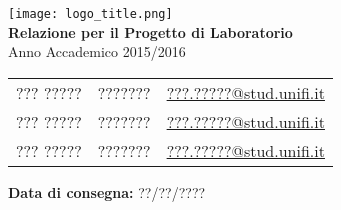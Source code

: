 \begin{center}
   	\texttt{[image: logo\_title.png]}\\[0.8cm]
    {\huge\bfseries Relazione per il Progetto di Laboratorio}\\
    Anno Accademico 2015/2016\\[0.8cm]
	
    \begin{tabular*}{\linewidth}{lll}
        ??? \textsc{?????} & ???????  & \href{mailto:???.?????@stud.unifi.it}{???.?????@stud.unifi.it} \\
        ??? \textsc{?????} & ???????  &  \href{mailto:???.?????@stud.unifi.it}{???.?????@stud.unifi.it}\\
        ??? \textsc{?????} & ???????  & \href{mailto:???.?????@stud.unifi.it}{???.?????@stud.unifi.it}
    \end{tabular*}
    
    \begin{flushleft}
    	\textbf{Data di consegna:} ??/??/????\\[1.2cm]
    \end{flushleft}
\end{center}
